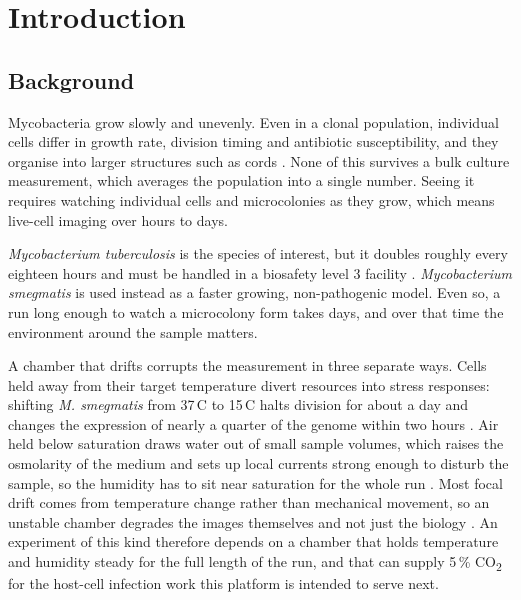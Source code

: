 \chapter{Introduction}
\label{ch:intro}

\section{Background}
\label{sec:background}

Mycobacteria grow slowly and unevenly. Even in a clonal population, individual cells differ in growth rate, division timing and antibiotic susceptibility, and they organise into larger structures such as cords \citep{aldridge_asymmetry_2012,davis_defining_2016,julian_microscopic_2010}. None of this survives a bulk culture measurement, which averages the population into a single number. Seeing it requires watching individual cells and microcolonies as they grow, which means live-cell imaging over hours to days.

\textit{Mycobacterium tuberculosis} is the species of interest, but it doubles roughly every eighteen hours and must be handled in a biosafety level 3 facility \citep{sparks_mycobacterium_nodate,chung_single-cell_2024}. \textit{Mycobacterium smegmatis} is used instead as a faster growing, non-pathogenic model. Even so, a run long enough to watch a microcolony form takes days, and over that time the environment around the sample matters.

A chamber that drifts corrupts the measurement in three separate ways. Cells held away from their target temperature divert resources into stress responses: shifting \textit{M. smegmatis} from 37\,\textdegree{}C to 15\,\textdegree{}C halts division for about a day and changes the expression of nearly a quarter of the genome within two hours \citep{grigorov_dynamic_2023}. Air held below saturation draws water out of small sample volumes, which raises the osmolarity of the medium and sets up local currents strong enough to disturb the sample, so the humidity has to sit near saturation for the whole run \citep{frigault_live-cell_2009,berthier_managing_2008-1}. Most focal drift comes from temperature change rather than mechanical movement, so an unstable chamber degrades the images themselves and not just the biology \citep{adler_reducing_2003}. An experiment of this kind therefore depends on a chamber that holds temperature and humidity steady for the full length of the run, and that can supply 5\,\% CO\textsubscript{2} for the host-cell infection work this platform is intended to serve next.

